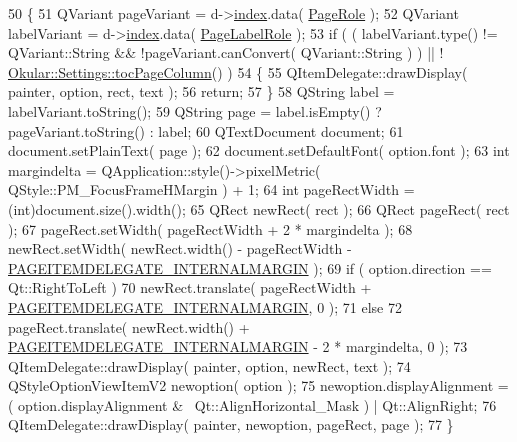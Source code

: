 \begin{DoxyCode}
50 \{
51     QVariant pageVariant = d->\hyperlink{classPageItemDelegate_1_1Private_a0183829c4130511959080e7e5c8fa188}{index}.data( \hyperlink{classPageItemDelegate_abd76ff54064145a88199c5c60880d91f}{PageRole} );
52     QVariant labelVariant = d->\hyperlink{classPageItemDelegate_1_1Private_a0183829c4130511959080e7e5c8fa188}{index}.data( \hyperlink{classPageItemDelegate_ac9fbbb47e84f3908d29c1ffa164ba90e}{PageLabelRole} );
53     \textcolor{keywordflow}{if} ( ( labelVariant.type() != QVariant::String && !pageVariant.canConvert( QVariant::String ) ) || !
      \hyperlink{classOkular_1_1Settings_abe5d7b63d6699c52a18f6a9e8bf15d5d}{Okular::Settings::tocPageColumn}() )
54     \{
55         QItemDelegate::drawDisplay( painter, option, rect, text );
56         \textcolor{keywordflow}{return};
57     \}
58     QString label = labelVariant.toString();
59     QString page = label.isEmpty() ? pageVariant.toString() : label;
60     QTextDocument document;
61     document.setPlainText( page );
62     document.setDefaultFont( option.font );
63     \textcolor{keywordtype}{int} margindelta = QApplication::style()->pixelMetric( QStyle::PM\_FocusFrameHMargin ) + 1;
64     \textcolor{keywordtype}{int} pageRectWidth = (int)document.size().width();
65     QRect newRect( rect );
66     QRect pageRect( rect );
67     pageRect.setWidth( pageRectWidth + 2 * margindelta );
68     newRect.setWidth( newRect.width() - pageRectWidth - 
      \hyperlink{pageitemdelegate_8cpp_aea23dba57a8b40c4ccf77b3960e0c7cf}{PAGEITEMDELEGATE\_INTERNALMARGIN} );
69     \textcolor{keywordflow}{if} ( option.direction == Qt::RightToLeft )
70         newRect.translate( pageRectWidth + \hyperlink{pageitemdelegate_8cpp_aea23dba57a8b40c4ccf77b3960e0c7cf}{PAGEITEMDELEGATE\_INTERNALMARGIN}, 
      0 );
71     \textcolor{keywordflow}{else}
72         pageRect.translate( newRect.width() + \hyperlink{pageitemdelegate_8cpp_aea23dba57a8b40c4ccf77b3960e0c7cf}{PAGEITEMDELEGATE\_INTERNALMARGIN}
       - 2 * margindelta, 0 );
73     QItemDelegate::drawDisplay( painter, option, newRect, text );
74     QStyleOptionViewItemV2 newoption( option );
75     newoption.displayAlignment = ( option.displayAlignment & ~Qt::AlignHorizontal\_Mask ) | Qt::AlignRight;
76     QItemDelegate::drawDisplay( painter, newoption, pageRect, page );
77 \}
\end{DoxyCode}
